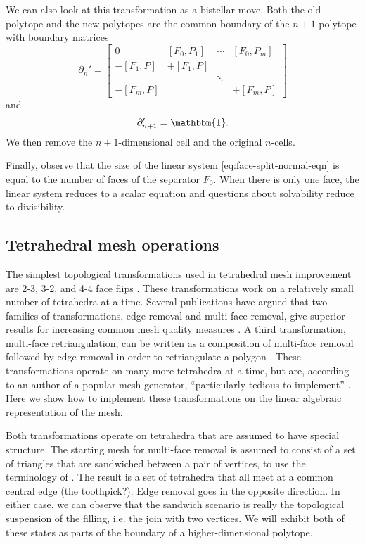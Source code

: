 \documentclass[twocolumn]{article}
\begin{document}
We can also look at this transformation as a bistellar move.
Both the old polytope and the new polytopes are the common boundary of the $n + 1$-polytope with boundary matrices
\begin{equation}
    \partial_n' = \left[\begin{matrix}0 & [F_0, P_1] & \cdots & [F_0, P_m] \\ -[F_1, P] & +[F_1, P] & & \\ & & \ddots & \\ -[F_m, P] & & & +[F_m, P]\end{matrix}\right]
\end{equation}
and
\begin{equation}
    \partial_{n + 1}' = \mathbbm{1}.
\end{equation}
We then remove the $n + 1$-dimensional cell and the original $n$-cells.

Finally, observe that the size of the linear system \eqref{eq:face-split-normal-eqn} is equal to the number of faces of the separator $F_0$.
When there is only one face, the linear system reduces to a scalar equation and questions about solvability reduce to divisibility.

\subsection{Tetrahedral mesh operations}

The simplest topological transformations used in tetrahedral mesh improvement are 2-3, 3-2, and 4-4 face flips \cite{cheng2013delaunay}.
These transformations work on a relatively small number of tetrahedra at a time.
Several publications have argued that two families of transformations, edge removal and multi-face removal, give superior results for increasing common mesh quality measures \cite{shewchuk2002two, klingner2008aggressive}.
A third transformation, multi-face retriangulation, can be written as a composition of multi-face removal followed by edge removal in order to retriangulate a polygon \cite{misztal2009tetrahedral}.
These transformations operate on many more tetrahedra at a time, but are, according to an author of a popular mesh generator, ``particularly tedious to implement'' \cite{marot2020reviving}.
Here we show how to implement these transformations on the linear algebraic representation of the mesh.

Both transformations operate on tetrahedra that are assumed to have special structure.
The starting mesh for multi-face removal is assumed to consist of a set of triangles that are sandwiched between a pair of vertices, to use the terminology of \cite{shewchuk2002two}.
The result is a set of tetrahedra that all meet at a common central edge (the toothpick?).
Edge removal goes in the opposite direction.
In either case, we can observe that the sandwich scenario is really the topological suspension of the filling, i.e. the join with two vertices.
We will exhibit both of these states as parts of the boundary of a higher-dimensional polytope.
\end{document}
